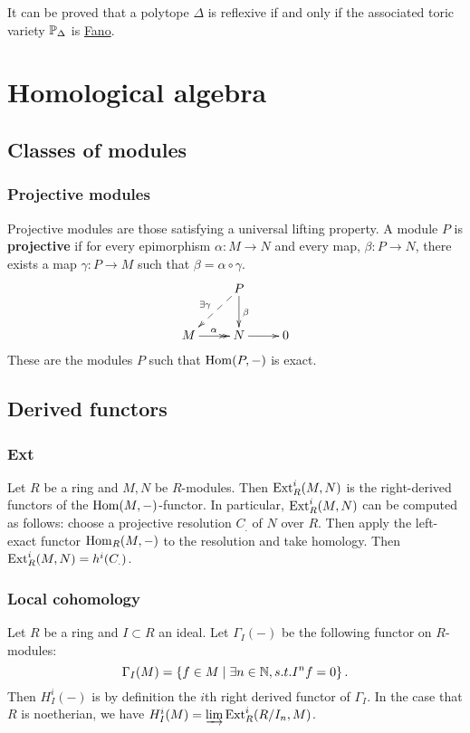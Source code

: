 \documentclass[11pt, english]{article}
\begin{document}
It can be proved that a polytope $\Delta$ is reflexive if and only if the associated toric variety $\mathbb{P}_\Delta$ is \hyperref[fano]{Fano}.

\section{Homological algebra}
\subsection{Classes of modules}
\subsubsection{Projective modules}
\label{projectivemodules}
Projective modules are those satisfying a universal lifting property. A module $P$ is \textbf{projective} if for every epimorphism $\alpha:M \to N$ and every map, $\beta:P \to N$, there exists a map $\gamma:P \to M$ such that $\beta = \alpha \circ \gamma$.
\[
\xymatrix{
 & P \ar@{-->}[dl]_{\exists\gamma} \ar[d]^\beta \\
M \ar@{->>}[r]^\alpha & N \ar[r] & 0
}
\]
These are the modules $P$ such that $\operatorname{Hom}(P,-)$ is exact.

\subsection{Derived functors}
\subsubsection{Ext}
\label{ext}
Let $R$ be a ring and $M,N$ be $R$-modules. Then $\operatorname{\mathrm{Ext}}_R^i(M,N)$ is the right-derived functors of the $\operatorname{Hom}(M,-)$-functor. In particular, $\operatorname{\mathrm{Ext}}^i_R(M,N)$ can be computed as follows: choose a projective resolution $C_.$ of $N$ over $R$. Then apply the left-exact functor $\operatorname{Hom}_R(M,-)$ to the resolution and take homology. Then $\operatorname{\mathrm{Ext}}_R^i(M,N)=h^i(C_.)$.

\subsubsection{Local cohomology}
\label{localcohomology}
Let $R$ be a ring and $I \subset R$ an ideal. Let $\Gamma_I(-)$ be the following functor on $R$-modules:
\[
\Gamma_I(M) = \left\{ f \in M \mid \exists n \in \mathbb{N}, s.t. I^n f = 0 \right \}.
\]
Then $H_I^i(-)$ is by definition the $i$th right derived functor of $\Gamma_I$.  In the case that $R$ is noetherian, we have $H_I^i(M) = \varinjlim \operatorname{\mathrm{Ext}}^i_R(R/I_n,M)$.
\end{document}
